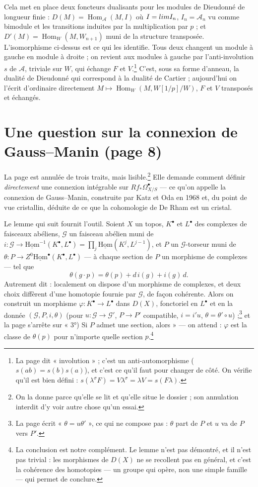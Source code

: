 \documentclass[11pt,a4paper]{article}
\begin{document}
Cela met en place deux foncteurs dualisants pour les modules de Dieudonné de
longueur finie : $D(M) = \operatorname{Hom}_{\mathcal{A}}(M, I)$ où $I =
\varinjlim I_n$, $I_n = \mathcal{A}_n$ vu comme bimodule et les transitions
induites par la multiplication par $p$ ; et $D'(M) = \operatorname{Hom}_W(M,
W_{n+1})$ muni de la structure transposée. L'isomorphisme ci-dessus est ce qui
les identifie. Tous deux changent un module à gauche en module à droite ; on
revient aux modules à gauche par l'anti-involution $s$ de $\mathcal{A}$, triviale
sur $W$, qui échange $F$ et $V$.\footnote{La page dit « involution » ; c'est
un anti-automorphisme ($s(ab) = s(b)s(a)$), et c'est ce qu'il faut pour
changer de côté. On vérifie qu'il est bien défini : $s(\lambda^\sigma F) =
V\lambda^\sigma = \lambda V = s(F\lambda)$.} C'est, sous sa forme d'anneau, la
dualité de Dieudonné qui correspond à la dualité de Cartier ; aujourd'hui on
l'écrit d'ordinaire directement $M \mapsto \operatorname{Hom}_W(M, W[1/p]/W)$,
$F$ et $V$ transposés et échangés.

\section*{Une question sur la connexion de Gauss--Manin (page 8)}

La page est annulée de trois traits, mais lisible.\footnote{On la donne parce
qu'elle se lit et qu'elle situe le dossier ; son annulation interdit d'y voir
autre chose qu'un essai.} Elle demande comment définir \emph{directement} une
connexion intégrable sur $R f_* \Omega^\bullet_{X/S}$ --- ce qu'on appelle la
connexion de Gauss--Manin, construite par Katz et Oda en 1968 et, du point de
vue cristallin, déduite de ce que la cohomologie de De Rham est un cristal.

Le lemme qui suit fournit l'outil. Soient $X$ un topos, $K^\bullet$ et
$L^\bullet$ des complexes de faisceaux abéliens, $\mathcal{G}$ un faisceau
abélien muni de $i : \mathcal{G} \to \underline{\mathrm{Hom}}^{-1}(K^\bullet,
L^\bullet) = \prod_j \underline{\mathrm{Hom}}(K^j, L^{j-1})$, et $P$ un
$\mathcal{G}$-torseur muni de $\theta : P \to Z^0
\underline{\mathrm{Hom}}^\bullet(K^\bullet, L^\bullet)$ --- à chaque section de
$P$ un morphisme de complexes --- tel que
\[
\theta(g \cdot p) = \theta(p) + d\, i(g) + i(g)\, d .
\]
Autrement dit : localement on dispose d'un morphisme de complexes, et deux
choix diffèrent d'une homotopie fournie par $\mathcal{G}$, de façon
cohérente. Alors on construit un morphisme $\varphi : K^\bullet \to L^\bullet$
dans $D(X)$, fonctoriel en $L^\bullet$ et en la donnée $(\mathcal{G}, P, i,
\theta)$ (pour $u : \mathcal{G} \to \mathcal{G}'$, $P \to P'$ compatible, $i =
i' u$, $\theta = \theta' \circ u$) ;\footnote{La page écrit « $\theta = u
\theta'$ », ce qui ne compose pas : $\theta$ part de $P$ et $u$ va de $P$ vers
$P'$.} et la page s'arrête sur « 3°) Si $P$ admet une section, alors » --- on
attend : $\varphi$ est la classe de $\theta(p)$ pour n'importe quelle section
$p$.\footnote{La conclusion est notre complément. Le lemme n'est pas
démontré, et il n'est pas trivial : les morphismes de $D(X)$ ne se recollent
pas en général, et c'est la cohérence des homotopies --- un groupe qui opère,
non une simple famille --- qui permet de conclure.}
\end{document}
